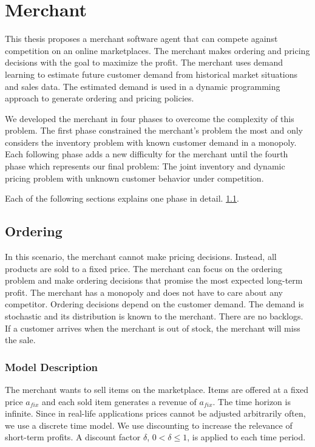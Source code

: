 
\chapter{Merchant}
This thesis proposes a merchant software agent that can compete against competition on an online marketplaces.
The merchant makes ordering and pricing decisions with the goal to maximize the profit.
The merchant uses demand learning to estimate future customer demand from historical market situations and sales data.
The estimated demand is used in a dynamic programming approach to generate ordering and pricing policies.

We developed the merchant in four phases to overcome the complexity of this problem.
The first phase constrained the merchant's problem the most and only considers the inventory problem with known customer demand in a monopoly.
Each following phase adds a new difficulty for the merchant until the fourth phase which represents our final problem: The joint inventory and dynamic pricing problem with unknown customer behavior under competition.

Each of the following sections explains one phase in detail.
 \cref{section:ordering}.

\section{Ordering}
\label{section:ordering}
In this scenario, the merchant cannot make pricing decisions.
Instead, all products are sold to a fixed price.
The merchant can focus on the ordering problem and make ordering decisions that promise the most expected long-term profit.
The merchant has a monopoly and does not have to care about any competitor.
Ordering decisions depend on the customer demand.
The demand is stochastic and its distribution is known to the merchant.
There are no backlogs. %
If a customer arrives when the merchant is out of stock, the merchant will miss the sale.

\subsection{Model Description}
The merchant wants to sell items on the marketplace.
Items are offered at a fixed price $a_{fix}$ and each sold item generates a revenue of $a_{fix}$.
The time horizon is infinite.
Since in real-life applications prices cannot be adjusted arbitrarily often, we use a discrete time
model.
We use discounting to increase the relevance of short-term profits.
A discount factor $\delta$, $0 < \delta \leq 1$, is applied to each time period.

